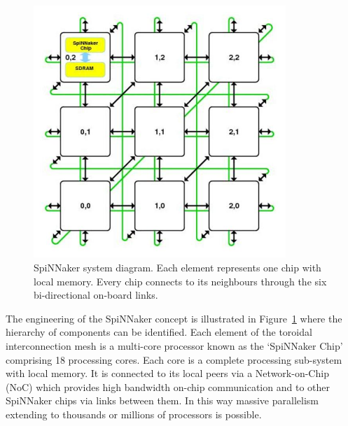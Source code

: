 \begin{figure}[h!]
	\centering
	\includegraphics[width=0.85\textwidth]{pics/mesh_ctiff_colour.jpg}
	\caption{SpiNNaker system diagram.
		Each element represents one chip with local memory.
		Every chip connects to its neighbours through the six bi-directional on-board links. }
	\label{fig:sysdia}
\end{figure}

The engineering of the SpiNNaker concept is illustrated in Figure~\ref{fig:sysdia} where the hierarchy of components can be identified. 
Each element of the toroidal interconnection mesh is a multi-core processor known as the `SpiNNaker Chip' comprising 18 processing cores. 
Each core is a complete processing sub-system with local memory.
It is connected to its local peers via a Network-on-Chip (NoC) which provides high bandwidth on-chip communication and to other SpiNNaker chips via links between them. 
In this way massive parallelism extending to thousands or millions of processors is possible.



%

